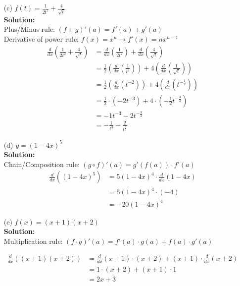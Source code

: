 \documentclass[a4paper]{article}
\begin{document}
\begin{enumerate}
\begin{enumerate}
		
			
		
		\item[(c)] $f(t) = \frac{1}{2t^2} + \frac{4}{\sqrt{t}}$\\
		\textbf{Solution:}\\
		
Plus/Minus rule: $(f \pm g)'(a) = f'(a) \pm g'(a)$\\		
Derivative of power rule: $f(x) = x^n \rightarrow f'(x) = nx^{n-1}$\\	

\begin{align*}
\frac{d}{dx}(\frac{1}{2t^2} + \frac{4}{\sqrt{t}}) &= \frac{d}{dx}(\frac{1}{2t^2}) + \frac{d}{dx}(\frac{4}{\sqrt{t}})\\
&= \frac{1}{2}(\frac{d}{dx}(\frac{1}{t^2})) + 4(\frac{d}{dx}(\frac{1}{\sqrt{t}}))\\
&= \frac{1}{2}(\frac{d}{dx}(t^{-2})) + 4(\frac{d}{dx}(t^{-\frac{1}{2}}))\\
&= \frac{1}{2} \cdot (-2t^{-3}) + 4 \cdot (-\frac{1}{2}t^{-\frac{3}{2}})\\
&= -1t^{-3} - 2 t^{-\frac{3}{2}}\\
&= -\frac{1}{t^3} - \frac{2}{t^{\frac{3}{2}}}
\end{align*}		
		
		\item[(d)] $y = (1 - 4x)^5$\\
		\textbf{Solution:}\\
		
Chain/Composition rule: $(g \circ f)'(a) = g'(f(a)) \cdot f'(a)$\\

\begin{align*}
\frac{d}{dx}((1 - 4x)^5) &= 5(1-4x)^4 \cdot \frac{d}{dx}(1-4x)\\
&= 5(1-4x)^4 \cdot (-4)\\
&= -20(1-4x)^4
\end{align*}			
		
		
		
		\item[(e)] $f(x) = (x + 1)(x + 2)$\\
		\textbf{Solution:}\\

Multiplication rule: $(f \cdot g)'(a) = f'(a) \cdot g(a) + f(a) \cdot g'(a)$

\begin{align*}
\frac{d}{dx}((x+1)(x+2)) &= \frac{d}{dx}(x+1) \cdot (x+2) + (x+1) \cdot \frac{d}{dx}(x+2)\\
&= 1 \cdot (x+2) + (x+1) \cdot 1\\
&= 2x + 3
\end{align*}	
		

\end{enumerate}
\end{enumerate}
\end{document}
